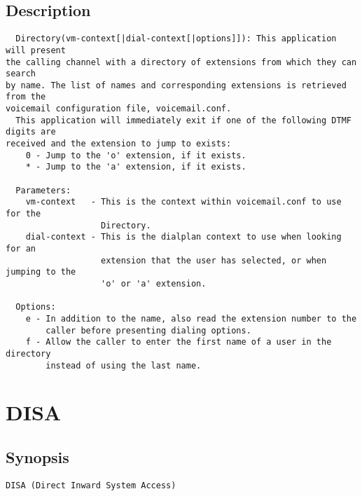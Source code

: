 \subsection{Description}
\begin{verbatim}
  Directory(vm-context[|dial-context[|options]]): This application will present
the calling channel with a directory of extensions from which they can search
by name. The list of names and corresponding extensions is retrieved from the
voicemail configuration file, voicemail.conf.
  This application will immediately exit if one of the following DTMF digits are
received and the extension to jump to exists:
    0 - Jump to the 'o' extension, if it exists.
    * - Jump to the 'a' extension, if it exists.

  Parameters:
    vm-context   - This is the context within voicemail.conf to use for the
                   Directory.
    dial-context - This is the dialplan context to use when looking for an
                   extension that the user has selected, or when jumping to the
                   'o' or 'a' extension.

  Options:
    e - In addition to the name, also read the extension number to the
        caller before presenting dialing options.
    f - Allow the caller to enter the first name of a user in the directory
        instead of using the last name.

\end{verbatim}


\section{DISA}
\subsection{Synopsis}
\begin{verbatim}
DISA (Direct Inward System Access)
\end{verbatim}
